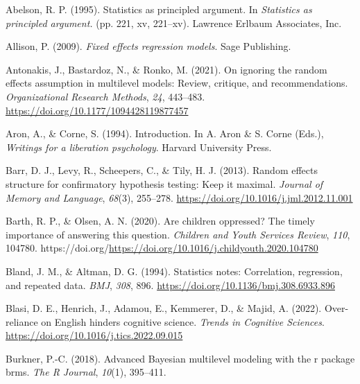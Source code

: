 \documentclass[
  letterpaper,
  DIV=11,
  numbers=noendperiod]{scrreprt}
\newlength{\cslhangindent}
\newlength{\cslentryspacingunit} %
\newenvironment{CSLReferences}[2] %
 {%
  \setlength{\parindent}{0pt}
  \ifodd #1
  \let\oldpar\par
  \def\par{\hangindent=\cslhangindent\oldpar}
  \fi
  \setlength{\parskip}{#2\cslentryspacingunit}
 }%
 {}
\begin{document}
\hypertarget{refs}{}
\begin{CSLReferences}{1}{0}
\leavevmode{}%
Abelson, R. P. (1995). Statistics as principled argument. In
\emph{Statistics as principled argument.} (pp. 221, xv, 221--xv).
Lawrence Erlbaum Associates, Inc.

\leavevmode{}%
Allison, P. (2009). \emph{Fixed effects regression models}. Sage
Publishing.

\leavevmode{}%
Antonakis, J., Bastardoz, N., \& Ronko, M. (2021). On ignoring the
random effects assumption in multilevel models: Review, critique, and
recommendations. \emph{Organizational Research Methods}, \emph{24},
443--483. \url{https://doi.org/10.1177/1094428119877457}

\leavevmode{}%
Aron, A., \& Corne, S. (1994). Introduction. In A. Aron \& S. Corne
(Eds.), \emph{Writings for a liberation psychology}. Harvard University
Press.

\leavevmode{}%
Barr, D. J., Levy, R., Scheepers, C., \& Tily, H. J. (2013). Random
effects structure for confirmatory hypothesis testing: Keep it maximal.
\emph{Journal of Memory and Language}, \emph{68}(3), 255--278.
\url{https://doi.org/10.1016/j.jml.2012.11.001}

\leavevmode{}%
Barth, R. P., \& Olsen, A. N. (2020). Are children oppressed? The timely
importance of answering this question. \emph{Children and Youth Services
Review}, \emph{110}, 104780.
https://doi.org/\url{https://doi.org/10.1016/j.childyouth.2020.104780}

\leavevmode{}%
Bland, J. M., \& Altman, D. G. (1994). Statistics notes: Correlation,
regression, and repeated data. \emph{BMJ}, \emph{308}, 896.
\url{https://doi.org/10.1136/bmj.308.6933.896}

\leavevmode{}%
Blasi, D. E., Henrich, J., Adamou, E., Kemmerer, D., \& Majid, A.
(2022). Over-reliance on {E}nglish hinders cognitive science.
\emph{Trends in Cognitive Sciences}.
\url{https://doi.org/10.1016/j.tics.2022.09.015}

\leavevmode{}%
Burkner, P.-C. (2018). Advanced {B}ayesian multilevel modeling with the
r package brms. \emph{The R Journal}, \emph{10}(1), 395--411.


\end{CSLReferences}
\end{document}
